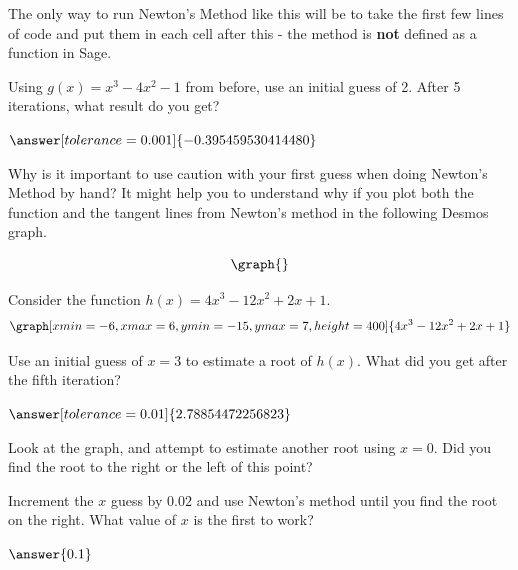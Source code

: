 \documentclass{ximera}
\begin{document}
The only way to run Newton's Method like this will be to take the first few lines of code and put them in each cell after this - the method is \textbf{not} defined as a function in Sage.

\begin{question}
Using $g(x) = x^3 -4x^2-1$ from before, use an initial guess of 2. After 5 iterations, what result do you get?

\begin{onlineOnly}
\begin{sageCell}

\end{sageCell}
\end{onlineOnly}

$\answer[tolerance=0.001]{-0.395459530414480}$

Why is it important to use caution with your first guess when doing Newton's Method by hand? It might help you to understand why if you plot both the function and the tangent lines from Newton's method in the following Desmos graph.

\[
\graph{}
\]

\begin{freeResponse}
\end{freeResponse}
\end{question}

\begin{question}
Consider the function $h(x) = 4x^3 - 12x^2 + 2x + 1$.
\[
\graph[xmin=-6,xmax=6,ymin=-15,ymax=7,height=400]{4x^3 - 12x^2 + 2x + 1}
\]
\begin{onlineOnly}
\begin{sageCell}

\end{sageCell}
\end{onlineOnly}


Use an initial guess of $x=3$ to estimate a root of $h(x)$. What did you get after the fifth iteration?

$\answer[tolerance=0.01]{2.78854472256823}$

Look at the graph, and attempt to estimate another root using $x = 0$. Did you find the root to the right or the left of this point?

\begin{multipleChoice}
\end{multipleChoice}

Increment the $x$ guess by $0.02$ and use Newton's method until you find the root on the right. What value of $x$ is the first to work?

\begin{onlineOnly}
\begin{sageCell}

\end{sageCell}
\end{onlineOnly}

$\answer{0.1}$
\end{question}
\end{document}
